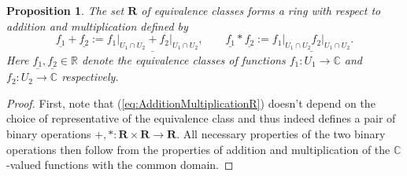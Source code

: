 \documentclass{amsart}
\newtheorem{proposition}[theorem]{Proposition}
\begin{document}
\begin{proposition}
The set $\mathbf R$ of equivalence classes forms a ring with respect to addition and multiplication defined by
\begin{equation}
\underline{f_1}+\underline{f_2}:=\underline{f_1\big|_{U_1\cap U_2}+f_2\big|_{U_1\cap U_2}},\qquad \underline{f_1}*\underline{f_2}:=\underline{f_1\big|_{U_1\cap U_2}f_2\big|_{U_1\cap U_2}}.
\label{eq:AdditionMultiplicationR}
\end{equation}
Here $\underline{f_1},\underline{f_2}\in\mathbb R$ denote the equivalence classes of functions $f_1:U_1\rightarrow\mathbb C$ and $f_2:U_2\rightarrow\mathbb C$ respectively.
\end{proposition}
\begin{proof}
First, note that (\ref{eq:AdditionMultiplicationR}) doesn't depend on the choice of representative of the equivalence class and thus indeed defines a pair of binary operations $+,*:\mathbf R\times\mathbf R\rightarrow\mathbf R$. All necessary properties of the two binary operations then follow from the properties of addition and multiplication of the $\mathbb C$-valued functions with the common domain.
\end{proof}
\end{document}
